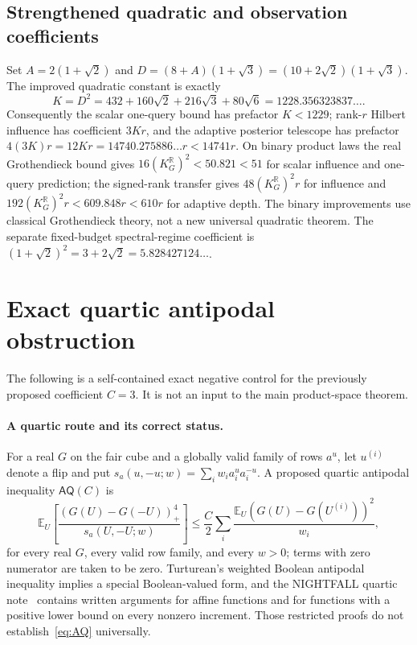 \documentclass[11pt]{article}
\numberwithin{equation}{section}
\theoremstyle{remark}
\newcommand{\E}{\mathbb E}
\newcommand{\pos}[1]{(#1)_{+}}
\begin{document}
\subsection*{Strengthened quadratic and observation coefficients}
Set $A=2(1+\sqrt2)$ and $D=(8+A)(1+\sqrt3)=(10+2\sqrt2)(1+\sqrt3)$. The improved quadratic constant is exactly
\[
 K=D^2=432+160\sqrt2+216\sqrt3+80\sqrt6
 =1228.356323837\ldots.
\]
Consequently the scalar one-query bound has prefactor $K<1229$; rank-$r$ Hilbert influence has coefficient $3Kr$, and the adaptive posterior telescope has prefactor $4(3K)r=12Kr=14740.275886\ldots r<14741r$. On binary product laws the real Grothendieck bound gives $16(K_G^{\mathbb R})^2<50.821<51$ for scalar influence and one-query prediction; the signed-rank transfer gives $48(K_G^{\mathbb R})^2r$ for influence and $192(K_G^{\mathbb R})^2r<609.848r<610r$ for adaptive depth. The binary improvements use classical Grothendieck theory, not a new universal quadratic theorem. The separate fixed-budget spectral-regime coefficient is $(1+\sqrt2)^2=3+2\sqrt2=5.828427124\ldots$.

\section{Exact quartic antipodal obstruction}\label{app:quartic}
The following is a self-contained exact negative control for the
previously proposed coefficient $C=3$. It is not an input to the main
product-space theorem.
\paragraph{A quartic route and its correct status.}
For a real $G$ on the fair cube and a globally valid family of rows $a^u$, let $u^{(i)}$ denote a flip and put
$s_a(u,-u;w)=\sum_iw_i a_i^ua_i^{-u}$. A proposed quartic antipodal inequality $\mathsf{AQ}(C)$ is
\begin{equation}\label{eq:AQ}
 \E_U\left[\frac{\pos{G(U)-G(-U)}^4}{s_a(U,-U;w)}\right]
 \le\frac C2\sum_i\frac{\E_U(G(U)-G(U^{(i)}))^2}{w_i},
\end{equation}
for every real $G$, every valid row family, and every $w>0$; terms with zero numerator are taken to be zero. Turturean's weighted Boolean antipodal inequality implies a special Boolean-valued form, and the NIGHTFALL quartic note~\cite{WriQuartic} contains written arguments for affine functions and for functions with a positive lower bound on every nonzero increment. Those restricted proofs do not establish~\eqref{eq:AQ} universally.
\end{document}
